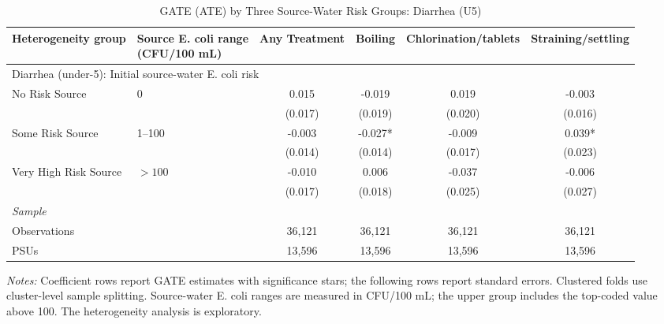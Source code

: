 \begin{landscape}
\begin{table}[p]
\centering
\caption{GATE (ATE) by Three Source-Water Risk Groups: Diarrhea (U5)}
\label{tab:table_gate_main_risk_groups-diarrhea}
\scriptsize\setlength{\tabcolsep}{4pt}
\begin{adjustbox}{max width=\linewidth, center}
\begin{tabular}{llcccc}
\toprule
Heterogeneity group & \shortstack{Source E. coli range\\(CFU/100 mL)} & Any Treatment & Boiling & Chlorination/tablets & Straining/settling \\
\midrule
\multicolumn{6}{l}{Diarrhea (under-5): Initial source-water E. coli risk} \\
No Risk Source & 0 & 0.015 & -0.019 & 0.019 & -0.003 \\
 &  & (0.017) & (0.019) & (0.020) & (0.016) \\
Some Risk Source & 1--100 & -0.003 & -0.027* & -0.009 & 0.039* \\
 &  & (0.014) & (0.014) & (0.017) & (0.023) \\
Very High Risk Source & $>100$ & -0.010 & 0.006 & -0.037 & -0.006 \\
 &  & (0.017) & (0.018) & (0.025) & (0.027) \\
\multicolumn{6}{l}{\textit{Sample}} \\
\quad Observations &  & 36,121 & 36,121 & 36,121 & 36,121 \\
\quad PSUs &  & 13,596 & 13,596 & 13,596 & 13,596 \\
\bottomrule
\end{tabular}
\end{adjustbox}
\par\vspace{3pt}
\begin{minipage}{\linewidth}\footnotesize \textit{Notes:} Coefficient rows report GATE estimates with significance stars; the following rows report standard errors. Clustered folds use cluster-level sample splitting. Source-water E. coli ranges are measured in CFU/100 mL; the upper group includes the top-coded value above 100. The heterogeneity analysis is exploratory.\end{minipage}
\end{table}
\end{landscape}